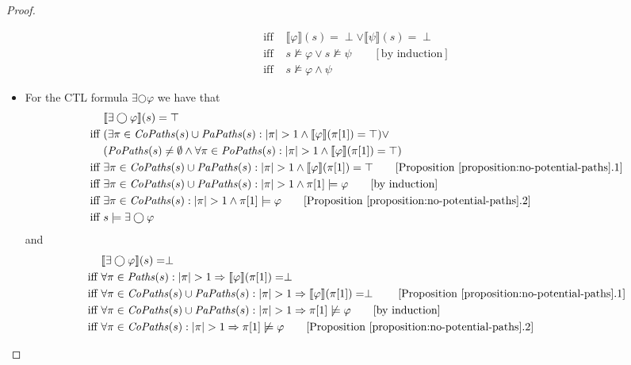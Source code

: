 \documentclass[12pt]{article}
\newcommand{\nxt}{\bigcirc}
\theoremstyle{definition}
\newcommand{\comment}[1]{\hspace{2em}[\mbox{#1}]}
\newcommand{\satisfaction}[1]{\llbracket #1 \rrbracket}
\newenvironment{franck}{\color{red}}{\color{black}}
\begin{document}
\begin{proof}
\begin{itemize}
\begin{align*}
\mbox{iff } & \satisfaction{\varphi}(s) = \perp \vee \satisfaction{\psi}(s) = \perp\\
\mbox{iff } & s \not\models \varphi \vee s \not\models \psi
\comment{by induction}\\
\mbox{iff } & s \not\models \varphi \wedge \psi
\end{align*}
\begin{franck}
\item
For the CTL formula $\exists \nxt \varphi$ we have that
\begin{align*}
& \satisfaction{\exists \nxt \varphi}(s) = \top\\
\mbox{iff } & (\exists \pi \in \mathit{CoPaths}(s) \cup \mathit{PaPaths}(s) : |\pi| > 1 \wedge \satisfaction{\varphi}(\pi[1]) = \top) \vee\\
& (\mathit{PoPaths}(s) \not= \emptyset \wedge \forall \pi \in \mathit{PoPaths}(s) : |\pi| > 1 \wedge \satisfaction{\varphi}(\pi[1]) = \top)\\
\mbox{iff } & \exists \pi \in \mathit{CoPaths}(s) \cup \mathit{PaPaths}(s) : |\pi| > 1 \wedge \satisfaction{\varphi}(\pi[1]) = \top
\comment{Proposition~\ref{proposition:no-potential-paths}.1}\\
\mbox{iff } & \exists \pi \in \mathit{CoPaths}(s) \cup \mathit{PaPaths}(s) : |\pi| > 1 \wedge \pi[1] \models \varphi
\comment{by induction}\\
\mbox{iff } & \exists \pi \in \mathit{CoPaths}(s) : |\pi| > 1 \wedge \pi[1] \models \varphi
\comment{Proposition~\ref{proposition:no-potential-paths}.2}\\
\mbox{iff } & s \models \exists \nxt \varphi
\end{align*}
and
\begin{align*}
& \satisfaction{\exists \nxt \varphi}(s) = \perp\\
\mbox{iff } & \forall \pi \in \mathit{Paths}(s) : |\pi| > 1 \Rightarrow \satisfaction{\varphi}(\pi[1]) = \perp\\
\mbox{iff } & \forall \pi \in \mathit{CoPaths}(s) \cup \mathit{PaPaths}(s) : |\pi| > 1 \Rightarrow \satisfaction{\varphi}(\pi[1]) = \perp
\comment{Proposition~\ref{proposition:no-potential-paths}.1}\\
\mbox{iff } & \forall \pi \in \mathit{CoPaths}(s) \cup \mathit{PaPaths}(s) : |\pi| > 1 \Rightarrow \pi[1] \not\models \varphi
\comment{by induction}\\
\mbox{iff } & \forall \pi \in \mathit{CoPaths}(s) : |\pi| > 1 \Rightarrow \pi[1] \not\models \varphi
\comment{Proposition~\ref{proposition:no-potential-paths}.2}\\

\end{align*}
\end{franck}
\end{itemize}
\end{proof}
\end{document}
